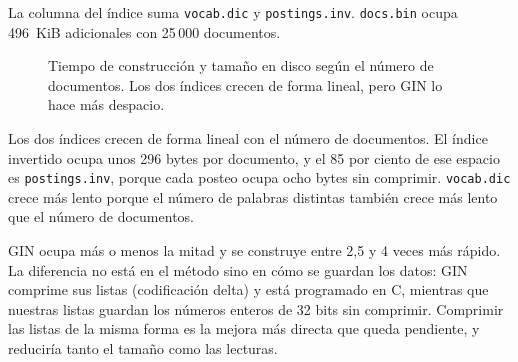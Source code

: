 \documentclass[a4paper,12pt]{article}
\begin{document}
La columna del índice suma \texttt{vocab.dic} y \texttt{postings.inv}.
\texttt{docs.bin} ocupa 496~KiB adicionales con 25\,000 documentos.

\begin{figure}[H]
\centering
{}
\caption{Tiempo de construcción y tamaño en disco según el número de
documentos. Los dos índices crecen de forma lineal, pero GIN lo hace más
despacio.}
\label{fig:e6-construccion}
\end{figure}

Los dos índices crecen de forma lineal con el número de documentos. El índice
invertido ocupa unos 296 bytes por documento, y el 85 por ciento de ese espacio
es \texttt{postings.inv}, porque cada posteo ocupa ocho bytes sin comprimir.
\texttt{vocab.dic} crece más lento porque el número de palabras distintas
también crece más lento que el número de documentos.

GIN ocupa más o menos la mitad y se construye entre 2,5 y 4 veces más rápido.
La diferencia no está en el método sino en cómo se guardan los datos: GIN
comprime sus listas (codificación delta) y está programado en C, mientras que
nuestras listas guardan los números enteros de 32 bits sin comprimir. Comprimir
las listas de la misma forma es la mejora más directa que queda pendiente, y
reduciría tanto el tamaño como las lecturas.
\end{document}
